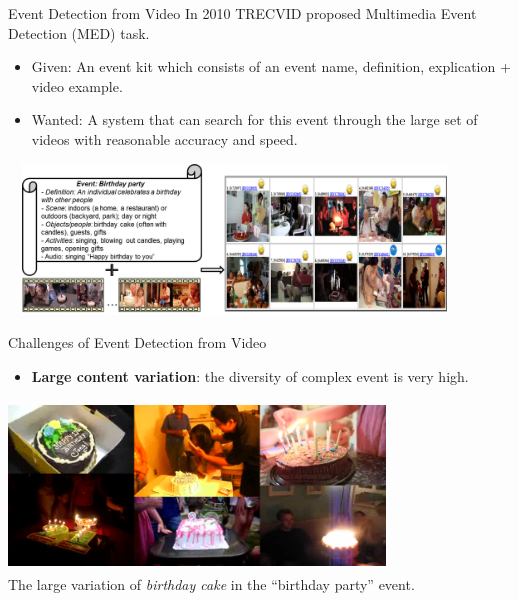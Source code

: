 \documentclass{beamer}
\begin{document}
\begin{frame}[t]{Event Detection from Video}
In 2010 TRECVID proposed Multimedia Event Detection (MED) task.
\begin{definition}
\begin{itemize}
\item Given: An event kit which consists of an event name, definition, explication + video example.
\item Wanted: A system that can search for this event through the large set of videos with reasonable accuracy and speed.
\end{itemize}
\end{definition}
\begin{center}
\includegraphics[width=12cm,height=4cm]{images/med_definition.png}
\end{center}


\end{frame}

\begin{frame}[t]{Challenges of Event Detection from Video}
	\begin{itemize}
		\item \textbf{Large content variation}: the diversity of complex
		event is very high.
	\end{itemize}
\begin{center}
\includegraphics[width=10cm,height=4.5cm]{images/part1/largevariation.png}
\\
The large variation of \textit{birthday cake} in the ``birthday party'' event.
\end{center}
\end{frame}
\end{document}
